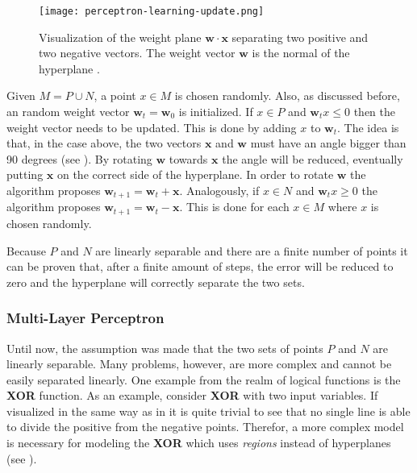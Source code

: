 \begin{figure}[htb!]
    \centering
    \texttt{[image: perceptron-learning-update.png]}
    \caption{Visualization of the weight plane $\bm{w} \cdot \bm{x}$ separating two positive and two negative vectors. The weight vector $\bm{w}$ is the normal of the hyperplane \cite{rojas_neural_1996}.}
    \label{fig:perceptron-learning-update}
\end{figure}

Given $M = P \cup N$, a point $x \in M$ is chosen randomly. 
Also, as discussed before, an random weight vector $\bm{w}_t = \bm{w}_0$ is initialized.
If $x \in P$ and $\bm{w}_t x \leq 0$ then the weight vector needs to be updated.
This is done by adding $x$ to $\bm{w}_t$.
The idea is that, in the case above, the two vectors $\bm{x}$ and $\bm{w}$ must have an angle bigger than 90 degrees (see ).
By rotating $\bm{w}$ towards $\bm{x}$ the angle will be reduced, eventually putting $\bm{x}$ on the correct side of the hyperplane.
In order to rotate $\bm{w}$ the algorithm proposes $\bm{w}_{t+1} = \bm{w}_{t} + \bm{x}$.
Analogously, if $x \in N$ and $\bm{w}_t x \geq 0$ the algorithm proposes $\bm{w}_{t+1} = \bm{w}_{t} - \bm{x}$.
This is done for each $x \in M$ where $x$ is chosen randomly.

Because $P$ and $N$ are linearly separable and there are a finite number of points it can be proven that, after a finite amount of steps, the error will be reduced to zero and the hyperplane will correctly separate the two sets.


\subsubsection{Multi-Layer Perceptron}
Until now, the assumption was made that the two sets of points $P$ and $N$ are linearly separable.
Many problems, however, are more complex and cannot be easily separated linearly.
One example from the realm of logical functions is the \textbf{XOR} function.
As an example, consider \textbf{XOR} with two input variables.
If visualized in the same way as in  it is quite trivial to see that no single line is able to divide the positive from the negative points.
Therefor, a more complex model is necessary for modeling the \textbf{XOR} which uses \textit{regions} instead of hyperplanes (see ).

